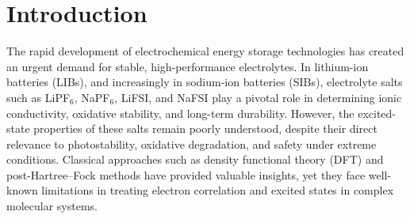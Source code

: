 \documentclass[num-refs]{wiley-article}
\begin{document}
\begin{frontmatter}
\begin{abstract}



\end{abstract}

\end{frontmatter}

\section{Introduction}

The rapid development of electrochemical energy storage technologies has created an urgent demand for stable, high-performance electrolytes. In lithium-ion batteries (LIBs), and increasingly in sodium-ion batteries (SIBs), electrolyte salts such as LiPF$_6$, NaPF$_6$, LiFSI, and NaFSI \cite{he2025research} play a pivotal role in determining ionic conductivity, oxidative stability, and long-term durability. However, the excited-state properties of these salts remain poorly understood, despite their direct relevance to photostability, oxidative degradation, and safety under extreme conditions. Classical approaches such as density functional theory (DFT) and post-Hartree--Fock methods have provided valuable insights, yet they face well-known limitations in treating electron correlation and excited states in complex molecular systems. 
\end{document}
